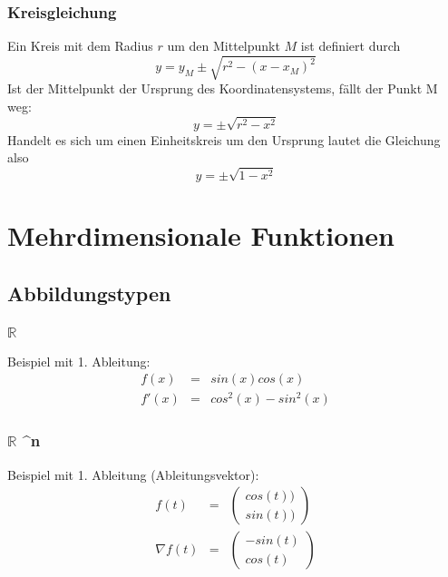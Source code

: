 \documentclass[a4paper,11pt]{article}
\begin{document}
	\subsubsection{Kreisgleichung} 
	\label{ssub:kreisgleichung}
	
	Ein Kreis mit dem Radius $r$ um den Mittelpunkt $M$ ist definiert durch
	\begin{equation}
		y = y_M \pm \sqrt{r^2 - (x-x_M)^2}
	\end{equation}
	Ist der Mittelpunkt der Ursprung des Koordinatensystems, fällt der Punkt M weg:
	\begin{equation}
		y = \pm \sqrt{r^2-x^2}
	\end{equation}
	Handelt es sich um einen Einheitskreis um den Ursprung lautet die Gleichung also
	\begin{equation}
		y = \pm \sqrt{1-x^2}
	\end{equation}
	
	\pagebreak
	
	\section{Mehrdimensionale Funktionen} %
	\label{sec:mehrdimensionale_funktionen}
	\subsection{Abbildungstypen} %
	\label{sub:abbildungstypen}
	
	\subsubsection{$\mathbb{R}$ \rightarrow {}}
	\label{ssub:r_rightarrow_r}
	Beispiel mit 1. Ableitung:
	\begin{eqnarray*}
		f(x) &=& sin(x)cos(x) \\
		f'(x) &=& cos^2(x)-sin^2(x)
	\end{eqnarray*}

	\subsubsection{$\mathbb{R}$ \rightarrow {}^n}
	\label{ssub:r_rightarrow_r}
	Beispiel mit 1. Ableitung (Ableitungsvektor):
	\begin{eqnarray*}
		f(t) &=& \left(\begin{array}{c} cos(t)) \\ sin(t))\end{array}\right) \\
		\nabla f(t) &=& \left( \begin{array}{c} -sin(t) \\ cos(t)\end{array} \right)
	\end{eqnarray*}
\end{document}
